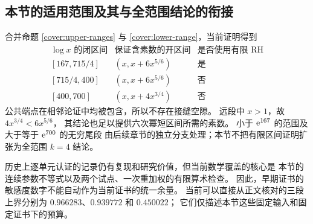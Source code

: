 \subsection{本节的适用范围及其与全范围结论的衔接}

合并命题 \ref{cover:upper-ranges} 与
\ref{cover:lower-range}，当前证明得到
\[
 \begin{array}{c|c|c}
 \log x\text{ 的闭区间}&\text{保证含素数的开区间}
                                  &\text{是否使用有限 RH}\\ \hline
 {[167,715/4]}&(x,x+6x^{5/6})&\text{是}\\
 {[715/4,400]}&(x,x+6x^{5/6})&\text{否}\\
 {[400,700]}&(x,x+4x^{3/4})&\text{否}
 \end{array}
\]
公共端点在相邻论证中均被包含，所以不存在接缝空隙。
远段中 $x>1$，故 $4x^{3/4}<6x^{5/6}$，
其结论也足以提供六次幂短区间所需的素数。
小于 $\mathrm e^{167}$ 的范围及大于等于 $\mathrm e^{700}$ 的无穷尾段
由后续章节的独立分支处理；本节不把有限区间证明扩张为全范围
$k=4$ 结论。

历史上逐单元认证的记录仍有复现和研究价值，但当前数学覆盖的核心是
本节的连续参数不等式以及两个试点、一次重加权的有限算术检查。
因此，早期证书的敏感度数字不能自动作为当前证书的统一余量。
当前可以直接从正文核对的三段上界分别为
$0.966283$、$0.939772$ 和 $0.450022$；
它们仅描述本节这些固定输入和固定证书下的预算。
